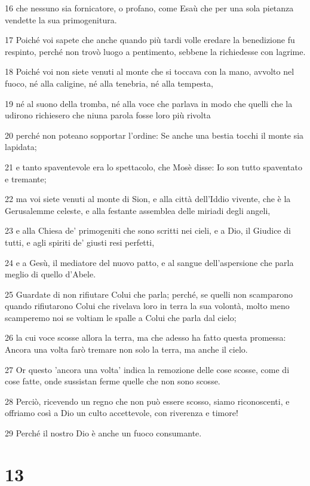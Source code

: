 \par 16 che nessuno sia fornicatore, o profano, come Esaù che per una sola pietanza vendette la sua primogenitura.
\par 17 Poiché voi sapete che anche quando più tardi volle eredare la benedizione fu respinto, perché non trovò luogo a pentimento, sebbene la richiedesse con lagrime.
\par 18 Poiché voi non siete venuti al monte che si toccava con la mano, avvolto nel fuoco, né alla caligine, né alla tenebria, né alla tempesta,
\par 19 né al suono della tromba, né alla voce che parlava in modo che quelli che la udirono richiesero che niuna parola fosse loro più rivolta
\par 20 perché non poteano sopportar l'ordine: Se anche una bestia tocchi il monte sia lapidata;
\par 21 e tanto spaventevole era lo spettacolo, che Mosè disse: Io son tutto spaventato e tremante;
\par 22 ma voi siete venuti al monte di Sion, e alla città dell'Iddio vivente, che è la Gerusalemme celeste, e alla festante assemblea delle miriadi degli angeli,
\par 23 e alla Chiesa de' primogeniti che sono scritti nei cieli, e a Dio, il Giudice di tutti, e agli spiriti de' giusti resi perfetti,
\par 24 e a Gesù, il mediatore del nuovo patto, e al sangue dell'aspersione che parla meglio di quello d'Abele.
\par 25 Guardate di non rifiutare Colui che parla; perché, se quelli non scamparono quando rifiutarono Colui che rivelava loro in terra la sua volontà, molto meno scamperemo noi se voltiam le spalle a Colui che parla dal cielo;
\par 26 la cui voce scosse allora la terra, ma che adesso ha fatto questa promessa: Ancora una volta farò tremare non solo la terra, ma anche il cielo.
\par 27 Or questo 'ancora una volta' indica la remozione delle cose scosse, come di cose fatte, onde sussistan ferme quelle che non sono scosse.
\par 28 Perciò, ricevendo un regno che non può essere scosso, siamo riconoscenti, e offriamo così a Dio un culto accettevole, con riverenza e timore!
\par 29 Perché il nostro Dio è anche un fuoco consumante.

\chapter{13}

